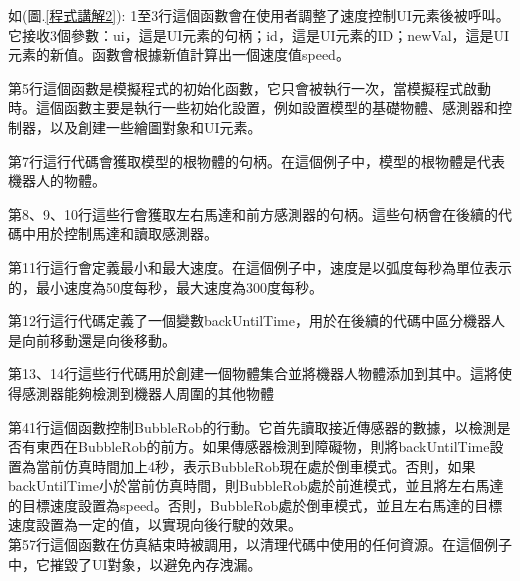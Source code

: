 如(圖.\ref{程式講解2}):
1至3行這個函數會在使用者調整了速度控制UI元素後被呼叫。它接收3個參數：ui，這是UI元素的句柄；id，這是UI元素的ID；newVal，這是UI元素的新值。函數會根據新值計算出一個速度值speed。

第5行這個函數是模擬程式的初始化函數，它只會被執行一次，當模擬程式啟動時。這個函數主要是執行一些初始化設置，例如設置模型的基礎物體、感測器和控制器，以及創建一些繪圖對象和UI元素。

第7行這行代碼會獲取模型的根物體的句柄。在這個例子中，模型的根物體是代表機器人的物體。

第8、9、10行這些行會獲取左右馬達和前方感測器的句柄。這些句柄會在後續的代碼中用於控制馬達和讀取感測器。

第11行這行會定義最小和最大速度。在這個例子中，速度是以弧度每秒為單位表示的，最小速度為50度每秒，最大速度為300度每秒。

第12行這行代碼定義了一個變數backUntilTime，用於在後續的代碼中區分機器人是向前移動還是向後移動。

第13、14行這些行代碼用於創建一個物體集合並將機器人物體添加到其中。這將使得感測器能夠檢測到機器人周圍的其他物體

第41行這個函數控制BubbleRob的行動。它首先讀取接近傳感器的數據，以檢測是否有東西在BubbleRob的前方。如果傳感器檢測到障礙物，則將backUntilTime設置為當前仿真時間加上4秒，表示BubbleRob現在處於倒車模式。否則，如果backUntilTime小於當前仿真時間，則BubbleRob處於前進模式，並且將左右馬達的目標速度設置為speed。否則，BubbleRob處於倒車模式，並且左右馬達的目標速度設置為一定的值，以實現向後行駛的效果。\\

第57行這個函數在仿真結束時被調用，以清理代碼中使用的任何資源。在這個例子中，它摧毀了UI對象，以避免內存洩漏。


\newpage
